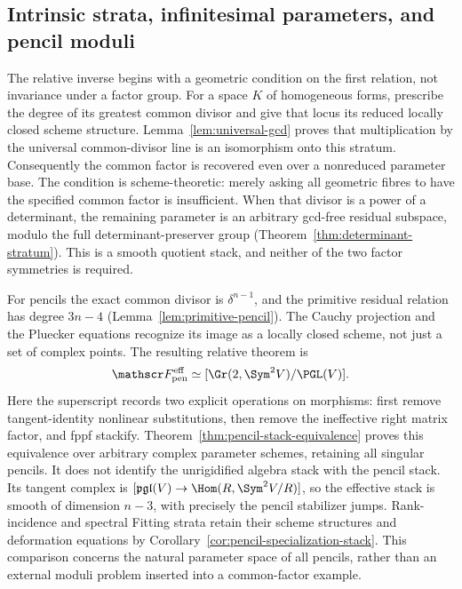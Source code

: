 \subsection{Intrinsic strata, infinitesimal parameters, and pencil moduli}
The relative inverse begins with a geometric condition on the first
relation, not invariance under a factor group.  For a space \(K\) of
homogeneous forms, prescribe the degree of its greatest common divisor
and give that locus its reduced locally closed scheme structure.
Lemma~\ref{lem:universal-gcd} proves that multiplication by the
universal common-divisor line is an isomorphism onto this stratum.
Consequently the common factor is recovered even over a nonreduced
parameter base.  The condition is scheme-theoretic: merely asking all
geometric fibres to have the specified common factor is insufficient.
When that divisor is a power of a determinant, the remaining
parameter is an arbitrary gcd-free residual subspace, modulo the
full determinant-preserver group
(Theorem~\ref{thm:determinant-stratum}).  This is a smooth quotient
stack, and neither of the two factor symmetries is required.

For pencils the exact common divisor is \(\delta^{n-1}\), and the
primitive residual relation has degree \(3n-4\)
(Lemma~\ref{lem:primitive-pencil}).  The Cauchy projection and the
Pluecker equations recognize its image as a locally closed scheme,
not just a set of complex points.  The resulting relative theorem is
\begin{equation}\label{eq:intro-effective-moduli}
 \mathscr F_{\rm pen}^{\rm eff}\simeq
                [\Gr(2,\Sym^2V)/\PGL(V)].
\end{equation}
Here the superscript records two explicit operations on morphisms:
first remove tangent-identity nonlinear substitutions, then remove
the ineffective right matrix factor, and fppf stackify.
Theorem~\ref{thm:pencil-stack-equivalence} proves this equivalence
over arbitrary complex parameter schemes, retaining all singular
pencils.  It does not identify the unrigidified algebra stack with
the pencil stack.  Its tangent complex is
\([\mathfrak{pgl}(V)\to\Hom(R,\Sym^2V/R)]\), so the effective
stack is smooth of dimension \(n-3\), with precisely the pencil
stabilizer jumps.  Rank-incidence and spectral Fitting strata retain
their scheme structures and deformation equations by
Corollary~\ref{cor:pencil-specialization-stack}.  This comparison
concerns the natural parameter space of all pencils, rather than an
external moduli problem inserted into a common-factor example.

